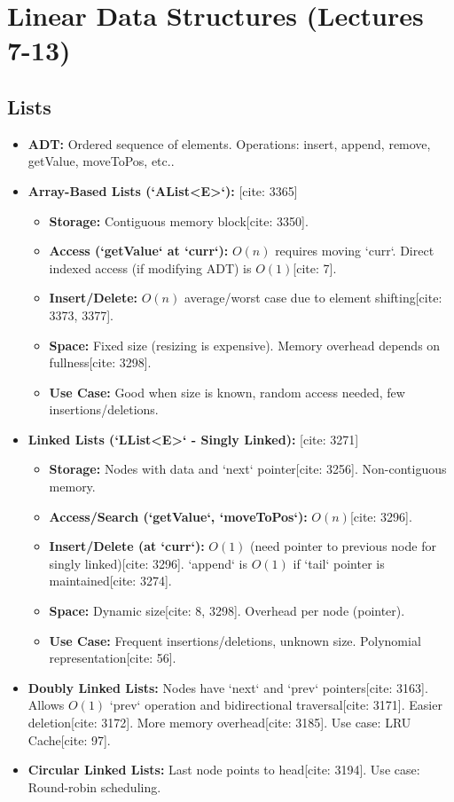 \documentclass{article}
\begin{document}
\section{Linear Data Structures (Lectures 7-13)}

\subsection{Lists}
\begin{itemize}
    \item \textbf{ADT:} Ordered sequence of elements. Operations: insert, append, remove, getValue, moveToPos, etc..
    \item \textbf{Array-Based Lists (`AList<E>`):} [cite: 3365]
          \begin{itemize}
              \item \textbf{Storage:} Contiguous memory block[cite: 3350].
              \item \textbf{Access (`getValue` at `curr`):} $O(n)$ requires moving `curr`. Direct indexed access (if modifying ADT) is $O(1)$[cite: 7].
              \item \textbf{Insert/Delete:} $O(n)$ average/worst case due to element shifting[cite: 3373, 3377].
              \item \textbf{Space:} Fixed size (resizing is expensive). Memory overhead depends on fullness[cite: 3298].
              \item \textbf{Use Case:} Good when size is known, random access needed, few insertions/deletions.
          \end{itemize}
    \item \textbf{Linked Lists (`LList<E>` - Singly Linked):} [cite: 3271]
          \begin{itemize}
              \item \textbf{Storage:} Nodes with data and `next` pointer[cite: 3256]. Non-contiguous memory.
              \item \textbf{Access/Search (`getValue`, `moveToPos`):} $O(n)$[cite: 3296].
              \item \textbf{Insert/Delete (at `curr`):} $O(1)$ (need pointer to previous node for singly linked)[cite: 3296]. `append` is $O(1)$ if `tail` pointer is maintained[cite: 3274].
              \item \textbf{Space:} Dynamic size[cite: 8, 3298]. Overhead per node (pointer).
              \item \textbf{Use Case:} Frequent insertions/deletions, unknown size. Polynomial representation[cite: 56].
          \end{itemize}
    \item \textbf{Doubly Linked Lists:} Nodes have `next` and `prev` pointers[cite: 3163]. Allows $O(1)$ `prev` operation and bidirectional traversal[cite: 3171]. Easier deletion[cite: 3172]. More memory overhead[cite: 3185]. Use case: LRU Cache[cite: 97].
    \item \textbf{Circular Linked Lists:} Last node points to head[cite: 3194]. Use case: Round-robin scheduling.
\end{itemize}
\end{document}

